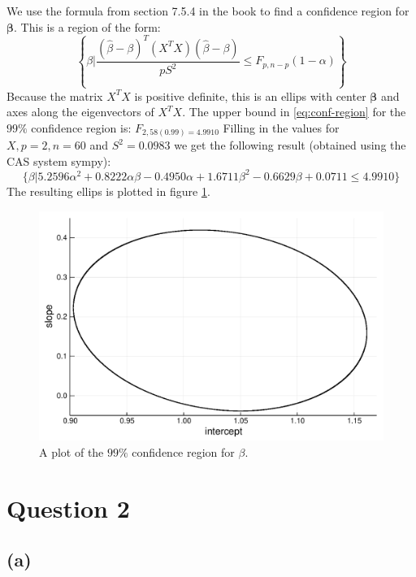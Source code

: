 \documentclass[a4paper]{article}
\begin{document}
We use the formula from section 7.5.4 in the book to find a confidence region for $\mathbf{\beta}$. This is a region of the form:
\begin{equation}
	\left\{ \beta \bigg| \frac{(\hat{\beta}-\beta)^T (X^TX) (\hat{\beta}-\beta)}{pS^2} \leq F_{p,n-p}(1-\alpha) \right\}
	\label{eq:conf-region}
\end{equation}
Because the matrix $X^TX$ is positive definite, this is an ellips with center $\mathbf{\beta}$ and axes along the eigenvectors of $X^TX$. The upper bound in \ref{eq:conf-region} for the $99\%$ confidence region is: $F_{2,58(0.99) = 4.9910}$ Filling in the values for $X, p=2, n=60$ and $S^2=0.0983$ we get the following result (obtained using the CAS system sympy):
\begin{equation*}
	\{ \beta | 5.2596 \alpha^{2} + 0.8222 \alpha \beta - 0.4950 \alpha + 1.6711 \beta^{2} - 0.6629 \beta + 0.0711 \leq 4.9910 \}
\end{equation*}
The resulting ellips is plotted in figure \ref{fig:1e}.
\begin{figure}        
	\centering
        \includegraphics[width=.9\linewidth]{region-1e.pdf}
        \caption{A plot of the $99\%$ confidence region for $\beta$.}
        \label{fig:1e}
\end{figure}


\newpage
\section*{Question 2}

\subsection*{(a)}
\noindent {}
\end{document}
